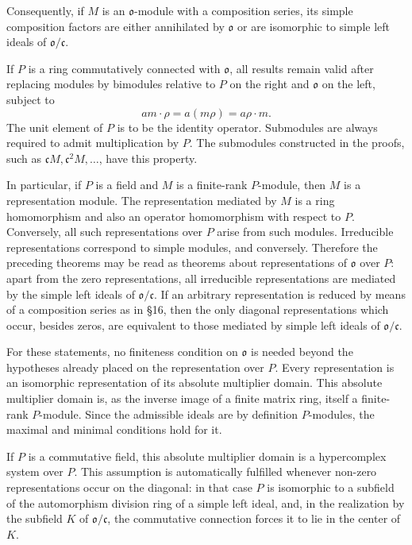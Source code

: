 \documentclass[11pt]{article}
\begin{document}
Consequently, if \(M\) is an \(\mathfrak{o}\)-module with a composition
series, its simple composition factors are either annihilated by
\(\mathfrak{o}\) or are isomorphic to simple left ideals of
\(\mathfrak{o}/\mathfrak c\).

If \(P\) is a ring commutatively connected with \(\mathfrak{o}\), all
results remain valid after replacing modules by bimodules relative to
\(P\) on the right and \(\mathfrak{o}\) on the left, subject to \[
  am\cdot\rho=a(m\rho)=a\rho\cdot m.
\] The unit element of \(P\) is to be the identity operator. Submodules
are always required to admit multiplication by \(P\). The submodules
constructed in the proofs, such as
\(\mathfrak cM,\mathfrak c^2M,\ldots\), have this property.

In particular, if \(P\) is a field and \(M\) is a finite-rank
\(P\)-module, then \(M\) is a representation module. The representation
mediated by \(M\) is a ring homomorphism and also an operator
homomorphism with respect to \(P\). Conversely, all such representations
over \(P\) arise from such modules. Irreducible representations
correspond to simple modules, and conversely. Therefore the preceding
theorems may be read as theorems about representations of
\(\mathfrak{o}\) over \(P\): apart from the zero representations, all
irreducible representations are mediated by the simple left ideals of
\(\mathfrak{o}/\mathfrak c\). If an arbitrary representation is reduced
by means of a composition series as in §16, then the only diagonal
representations which occur, besides zeros, are equivalent to those
mediated by simple left ideals of \(\mathfrak{o}/\mathfrak c\).

For these statements, no finiteness condition on \(\mathfrak{o}\) is
needed beyond the hypotheses already placed on the representation over
\(P\). Every representation is an isomorphic representation of its
absolute multiplier domain. This absolute multiplier domain is, as the
inverse image of a finite matrix ring, itself a finite-rank
\(P\)-module. Since the admissible ideals are by definition
\(P\)-modules, the maximal and minimal conditions hold for it.

If \(P\) is a commutative field, this absolute multiplier domain is a
hypercomplex system over \(P\). This assumption is automatically
fulfilled whenever non-zero representations occur on the diagonal: in
that case \(P\) is isomorphic to a subfield of the automorphism division
ring of a simple left ideal, and, in the realization by the subfield
\(K\) of \(\mathfrak{o}/\mathfrak c\), the commutative connection forces
it to lie in the center of \(K\).
\end{document}
